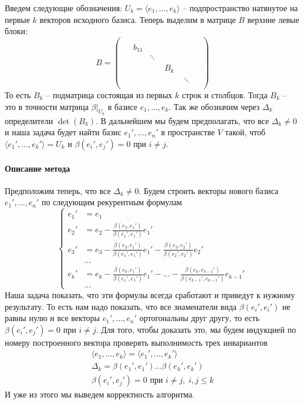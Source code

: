 Введем следующие обозначения: $U_k = \langle e_1,\ldots,e_k\rangle$  -- подпространство натянутое на первые $k$ векторов исходного базиса.
Теперь выделим в матрице $B$ верхние левые блоки:
\[
B =
\begin{pmatrix}
{\boxed{
\begin{matrix}
{
\boxed{
\begin{matrix}
{
\boxed{
\begin{matrix}
{\boxed{b_{11}}}&{}\\
{}&{\ddots}
\end{matrix}
}
}&{}\\
{}&{B_k}
\end{matrix}
}
}&{}\\
{}&{\ddots}
\end{matrix}
}
}&{}\\
{}&{}
\end{pmatrix}
\]
То есть $B_k$ -- подматрица состоящая из первых $k$ строк и столбцов.
Тогда $B_k$ -- это в точности матрица $\beta|_{U_k}$ в базисе $e_1,\ldots,e_k$.
Так же обозначим через $\Delta_k$ определители $\det (B_k)$.
В дальнейшем мы будем предполагать, что все $\Delta_k \neq 0$ и наша задача будет найти базис $e_1',\ldots,e_n'$ в пространстве $V$ такой, чтоб $\langle e_1',\ldots,e_k'\rangle = U_k$ и $\beta(e_i',e_j') = 0$ при $i\neq j$.


\paragraph{Описание метода}

Предположим теперь, что все $\Delta_k\neq 0$.
Будем строить векторы нового базиса $e_1',\ldots,e_n'$ по следующим рекурентным формулам
\[
\left\{
\begin{aligned}
e_1' &= e_1\\
e_2'  &= e_2 - \frac{\beta(e_2, e_1')}{\beta(e_1',e_1')}e_1'\\
e_3'  &= e_3 - \frac{\beta(e_3, e_1')}{\beta(e_1',e_1')}e_1'- \frac{\beta(e_3, e_2')}{\beta(e_2',e_2')}e_2'\\
&\ldots\\
e_k' &= e_k - \frac{\beta(e_k, e_1')}{\beta(e_1',e_1')}e_1' - \ldots - \frac{\beta(e_k, e_{k-1}')}{\beta(e_{k-1}',e_{k-1}')}e_{k-1}'\\
&\ldots
\end{aligned}
\right.
\]
Наша задача показать, что эти формулы всегда сработают и приведут к нужному результату.
То есть нам надо показать, что все знаменатели вида $\beta(e_i',e_i')$ не равны нулю и все векторы $e_1',\ldots,e_n'$ ортогональны друг другу, то есть $\beta(e_i', e_j') = 0$ при $i\neq j$.
Для того, чтобы доказать это, мы будем индукцией по номеру построенного вектора проверять выполнимость трех инвариантов
\begin{gather*}
\langle e_1,\ldots,e_k\rangle = \langle e_1',\ldots, e_k'\rangle\\
\Delta_k = \beta(e_1',e_1') \ldots \beta(e_k',e_k')\\
\beta(e_i',e_j') = 0\text{ при }i\neq j,\;i,j\leqslant k
\end{gather*}
И уже из этого мы выведем корректность алгоритма.


